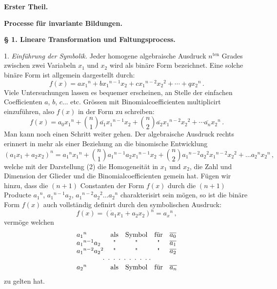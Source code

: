 \documentclass[11pt]{article}
\providecommand{\weberpage}[1]{}
\providecommand{\weq}[2]{\begin{equation}\tag{#1}#2\end{equation}}
\begin{document}
\weberpage{1}
\begin{center}
\textbf{Erster Theil.}
\end{center}

\begin{center}
\textbf{Processe für invariante Bildungen.}
\end{center}

\begin{center}
\textbf{§ 1. Lineare Transformation und Faltungsprocess.}
\end{center}

1. \textit{Einführung der Symbolik.} Jeder homogene algebraische Ausdruck $n^{\text{ten}}$ Grades zwischen zwei Variabeln $x_1$ und $x_2$ wird als \glqq binäre Form\grqq{} bezeichnet. Eine solche binäre Form ist allgemein dargestellt durch:
\weq{1}{f(x) = ax_1{}^n + bx_1{}^{n-1}x_2 + cx_1{}^{n-2}x_2{}^2 + \cdots + qx_2{}^n\,.}
Viele Untersuchungen lassen es bequemer erscheinen, an Stelle der einfachen Coefficienten $a$, $b$, $c \ldots$ etc. Grössen mit Binomialcoefficienten multiplicirt einzuführen, also $f(x)$ in der Form zu schreiben:
\weq{2}{f(x) = a_0x_1{}^n + \binom{n}{1}\overline{a_1}x_1{}^{n-1}x_2 + \binom{n}{2}\overline{a_2}x_1{}^{n-2}x_2{}^2 + \cdots \overline{a_n}x_2{}^n\,.}
Man kann noch einen Schritt weiter gehen. Der algebraische Ausdruck rechts erinnert in mehr als einer Beziehung an die binomische Entwicklung
\weq{3}{(a_1x_1+a_2x_2)^n = a_1{}^nx_1{}^n + \binom{n}{1}a_1{}^{n-1}a_2x_1{}^{n-1}x_2 + \binom{n}{2}a_1{}^{n-2}a_2{}^2x_1{}^{n-2}x_2{}^2 + \ldots a_2{}^nx_2{}^n\,,}
welche mit der Darstellung (2) die Homogeneität in $x_1$ und $x_2$, die Zahl und Dimension der Glieder und die Binomialcoefficienten gemein hat. Fügen wir hinzu, dass die $(n+1)$ Constanten der Form $f(x)$ durch die $(n+1)$ Producte $a_1{}^n$, $a_1{}^{n-1}a_2$, $a_1{}^{n-2}a_2{}^2\ldots a_2{}^n$ charakterisirt sein mögen, so ist die binäre Form $f(x)$ auch vollständig definirt durch den symbolischen Ausdruck:
\[
f(x) = (\dot a_1x_1 + a_2x_2)^n = a_x{}^n\,,
\]
vermöge welchen
\[
\begin{array}{lcccl}
a_1{}^n & \text{als} & \text{Symbol} & \text{für} & \overline{a_0} \\
a_1{}^{n-1}a_2 & \text{\textquotedbl} & \text{\textquotedbl} & \text{\textquotedbl} & \overline{a_1} \\
a_1{}^{n-2}a_2{}^2 & \text{\textquotedbl} & \text{\textquotedbl} & \text{\textquotedbl} & \overline{a_2} \\
\multicolumn{5}{c}{\cdot\;\cdot\;\cdot\;\cdot\;\cdot\;\cdot\;\cdot\;\cdot\;\cdot\;\cdot} \\
a_2{}^n & \text{als} & \text{Symbol} & \text{für} & \overline{a_n}
\end{array}
\]
zu gelten hat.
\end{document}
